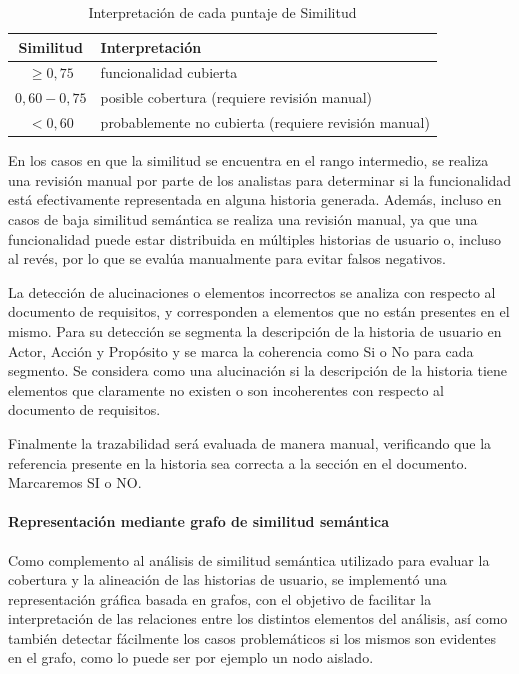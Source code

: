 \begin{table}[ht]
\caption{Interpretación de cada puntaje de Similitud}
\label{tab:similitudint}
\centering
\begin{tabular}{|c|l|}
\hline
\textbf{Similitud} & \textbf{Interpretación} \\ \hline
$\geq 0{,}75$ & funcionalidad cubierta \\ \hline
$0{,}60 - 0{,}75$ & posible cobertura (requiere revisión manual) \\ \hline
$< 0{,}60$ & probablemente no cubierta (requiere revisión manual) \\ \hline
\end{tabular}
\end{table}

En los casos en que la similitud se encuentra en el rango intermedio, se realiza una revisión manual por parte de los analistas para determinar si la funcionalidad está efectivamente representada en alguna historia generada. Además, incluso en casos de baja similitud semántica se realiza una revisión manual, ya que una funcionalidad puede estar distribuida en múltiples historias de usuario o, incluso al revés, por lo que se evalúa manualmente para evitar falsos negativos.

La detección de alucinaciones o elementos incorrectos se analiza con respecto al documento de requisitos, y corresponden a elementos que no están presentes en el mismo. Para su detección se segmenta la descripción de la historia de usuario en Actor, Acción y Propósito y se marca la coherencia como Si o No para cada segmento. Se considera como una alucinación si la descripción de la historia tiene elementos que claramente no existen o son incoherentes con respecto al documento de requisitos.

Finalmente la trazabilidad será evaluada de manera manual, verificando que la referencia presente en la historia sea correcta a la sección en el documento. Marcaremos SI o NO.

\paragraph{Representación mediante grafo de similitud semántica}
Como complemento al análisis de similitud semántica utilizado para evaluar la cobertura y la alineación de las historias de usuario, se implementó una representación gráfica basada en grafos, con el objetivo de facilitar la interpretación de las relaciones entre los distintos elementos del análisis, así como también detectar fácilmente los casos problemáticos si los mismos son evidentes en el grafo, como lo puede ser por ejemplo un nodo aislado.

